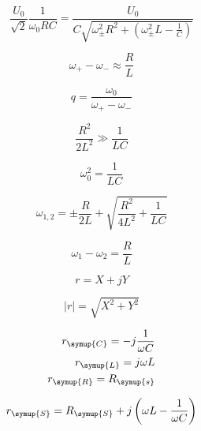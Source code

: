     \begin{equation}
        \frac{U_0}{\sqrt{2}} \frac{1}{\omega_0 RC} = \frac{U_0}{C \sqrt{\omega^2_{\pm} R^2 + \left( \omega^2_{\pm}L - \frac{1}{C} \right) }} \nonumber
    \end{equation}

    \begin{equation}
        \omega_+ - \omega_- \approx \frac{R}{L} \nonumber
    \end{equation}

    \begin{equation}
        q = \frac{\omega_0}{\omega_+ - \omega_-} \nonumber
    \end{equation}

    \begin{equation}
        \frac{R^2}{2L^2} \gg \frac{1}{LC} \nonumber
    \end{equation}

    \begin{equation}
        \omega^2_0 = \frac{1}{LC} \nonumber
    \end{equation}

    \begin{equation}
        \omega_{1,2} = \pm  \frac{R}{2L} + \sqrt{\frac{R^2}{4L^2}+ \frac{1}{LC}} \nonumber
    \end{equation}

    \begin{equation}
        \omega_1 - \omega_2 = \frac{R}{L} \nonumber
    \end{equation}

    \begin{equation}
        r = X + jY \nonumber
    \end{equation}

    \begin{equation}
        |r| = \sqrt{X^2 + Y^2} \nonumber
    \end{equation}

    \begin{align}
        r_{\symup{C}} = -j\frac{1}{\omega C} \nonumber\\
        r_{\symup{L}} = j\omega L  \nonumber\\
        r_{\symup{R}} = R_{\symup{s}} \nonumber
    \end{align}

    \begin{equation}
        r_{\symup{S}} = R_{\symup{S}} + j \left(    \omega L - \frac{1}{\omega C} \right) \nonumber
    \end{equation}

